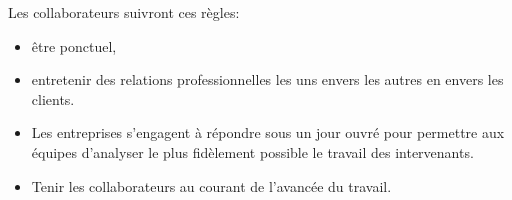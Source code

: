Les collaborateurs suivront ces règles:
\begin{itemize}
\item être ponctuel,
\item entretenir des relations professionnelles les uns envers les
        autres en envers les clients.
\item Les entreprises s'engagent à répondre sous un jour ouvré pour 
        permettre aux équipes d'analyser le plus fidèlement possible
        le travail des intervenants.
\item Tenir les collaborateurs au courant de l'avancée du travail.
\end{itemize}
